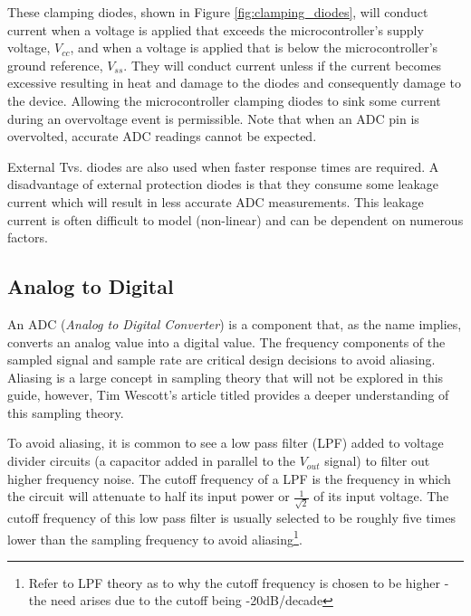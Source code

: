 \documentclass[main.tex]{subfiles}
\begin{document}
\noindent These clamping diodes, shown in Figure \ref{fig:clamping_diodes}, will conduct current when a voltage is applied that exceeds the microcontroller's supply voltage, $V_{cc}$, and when a voltage is applied that is below the microcontroller's ground reference, $V_{ss}$. They will conduct current unless if the current becomes excessive resulting in heat and damage to the diodes and consequently damage to the device. Allowing the microcontroller clamping diodes to sink some current during an overvoltage event is permissible. Note that when an ADC pin is overvolted, accurate ADC readings cannot be expected. \newline

\newnoindentpara External Tvs. diodes are also used when faster response times are required. A disadvantage of external protection diodes is that they consume some leakage current which will result in less accurate ADC measurements. This leakage current is often difficult to model (non-linear) and can be dependent on numerous factors.

\subsection{Analog to Digital}
An ADC (\textit{Analog to Digital Converter}) is a component that, as the name implies, converts an analog value into a digital value. The frequency components of the sampled signal and sample rate are critical design decisions to avoid aliasing. Aliasing is a large concept in sampling theory that will not be explored in this guide, however, Tim Wescott's article titled  provides a deeper understanding of this sampling theory. \newline

\newnoindentpara To avoid aliasing, it is common to see a low pass filter (LPF) added to voltage divider circuits (a capacitor added in parallel to the $V_{out}$ signal) to filter out higher frequency noise. The cutoff frequency of a LPF is the frequency in which the circuit will attenuate to half its input power or $\frac{1}{\sqrt{2}}$ of its input voltage. The cutoff frequency of this low pass filter is usually selected to be roughly five times lower than the sampling frequency to avoid aliasing\footnote{Refer to LPF theory as to why the cutoff frequency is chosen to be higher - the need arises due to the cutoff being -20dB/decade}. 
\end{document}
